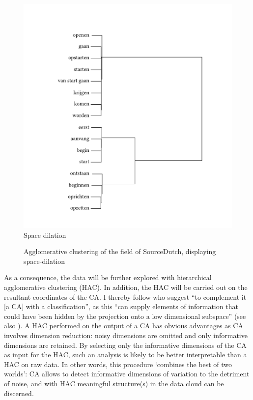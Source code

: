 \begin{figure}%
\includegraphics[height=.4\textheight]{figures/tree29.pdf}
Space dilation
\caption{\label{fig:3:29} Agglomerative clustering of the field of SourceDutch, displaying space-dilation}
\end{figure}

As a consequence, the data will be further explored with hierarchical agglomerative clustering (HAC). In addition, the HAC will be carried out on the resultant coordinates of the CA. I thereby follow \citet[335]{cuadras_correspondence_1993} who suggest “to complement it [a CA] with a classification”, as this “can supply elements of information that could have been hidden by the projection onto a low dimensional subspace” (see also \citealt[28]{ciampi_correspondence_2005}). A HAC performed on the output of a CA has obvious advantages as CA involves dimension reduction: noisy dimensions are omitted and only informative dimensions are retained. By selecting only the informative dimensions of the CA as input for the HAC, such an analysis is likely to be better interpretable than a HAC on raw data. In other words, this procedure ‘combines the best of two worlds’: CA allows to detect informative dimensions of variation to the detriment of noise, and with HAC meaningful structure(s) in the data cloud can be discerned.

